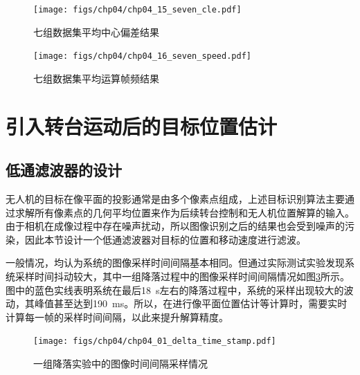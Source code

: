 \begin{figure}[ht]   
	\centering
	\texttt{[image: figs/chp04/chp04\_15\_seven\_cle.pdf]}
	\caption{七组数据集平均中心偏差结果}
	\label{fig:chp04_15_seven_cle}
\end{figure}

\begin{figure}[ht]   
	\centering
	\texttt{[image: figs/chp04/chp04\_16\_seven\_speed.pdf]}
	\caption{七组数据集平均运算帧频结果}
	\label{fig:chp04_16_seven_speed}
\end{figure}


\section{引入转台运动后的目标位置估计}
\subsection{低通滤波器的设计}
无人机的目标在像平面的投影通常是由多个像素点组成，上述目标识别算法主要通过求解所有像素点的几何平均位置来作为后续转台控制和无人机位置解算的输入。由于相机在成像过程中存在噪声扰动，所以图像识别之后的结果也会受到噪声的污染，因此本节设计一个低通滤波器对目标的位置和移动速度进行滤波。

一般情况，均认为系统的图像采样时间间隔基本相同。但通过实际测试实验发现系统采样时间抖动较大，其中一组降落过程中的图像采样时间间隔情况如图\ref{fig:chp04_01_delta_time_stamp}所示。图中的蓝色实线表明系统在最后18\ s左右的降落过程中，系统的采样出现较大的波动，其峰值甚至达到190\ ms。所以，在进行像平面位置估计等计算时，需要实时计算每一帧的采样时间间隔，以此来提升解算精度。

\begin{figure}[ht]   
	\centering
	\texttt{[image: figs/chp04/chp04\_01\_delta\_time\_stamp.pdf]}
	\caption{一组降落实验中的图像时间间隔采样情况}
	\label{fig:chp04_01_delta_time_stamp}
\end{figure}

